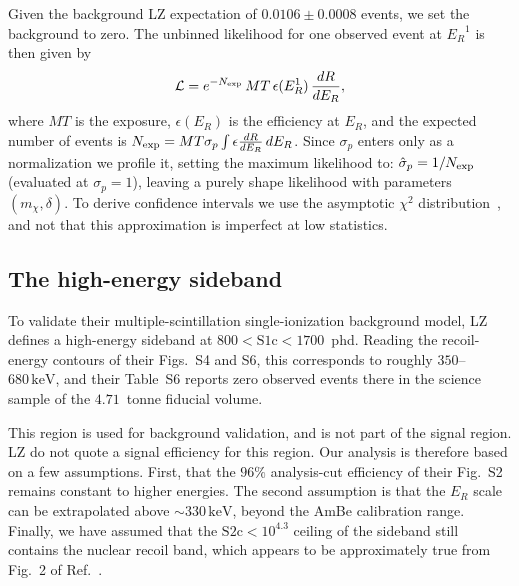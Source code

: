 \documentclass[aps,prl,twocolumn,superscriptaddress,nofootinbib,floatfix,longbibliography]{revtex4-2}
\newcommand{\keV}{\ensuremath{\,\mathrm{keV}}}
\newcommand{\ER}{\ensuremath{E_R}}
\newcommand{\mchi}{\ensuremath{m_\chi}}
\begin{document}
Given the background LZ expectation of $0.0106\pm0.0008$ events, we set the background to zero. The unbinned likelihood for one observed event at $\ER^{1}$ is then given by
%
\begin{equation}
  \mathcal{L} = e^{-N_{\rm exp}}\, MT\, \epsilon(\ER^{1})\,\frac{dR}{d\ER},
\end{equation}
%
where $MT$ is the exposure, $\epsilon(E_R)$ is the efficiency at $E_R$, and the expected number of events is $N_{\rm exp} = MT\sigma_p\int \epsilon \frac{dR}{d\ER}\, d\ER$. Since $\sigma_p$ enters only as a normalization we profile it, setting the maximum likelihood to: $\hat\sigma_p = 1/N_{\rm exp}$ (evaluated at $\sigma_p=1$), leaving a purely shape likelihood with parameters $(\mchi,\delta)$. To derive confidence intervals we use the asymptotic $\chi^2$ distribution~\cite{Cowan:2010js}, and not that this approximation is imperfect at low statistics.
 

\subsection{The high-energy sideband}
\label{sec:sideband}

To validate their multiple-scintillation single-ionization background model, LZ defines a high-energy sideband at $800 < \mathrm{S1c} < 1700$~phd. Reading the recoil-energy contours of their Figs.~S4 and S6, this corresponds to roughly $350$--$680\keV$, and their Table~S6 reports zero observed events there in the science sample of the $4.71$~tonne fiducial volume.

This region is used for background validation, and is not part of the signal region. LZ do not quote a signal efficiency for this region. Our analysis is therefore based on a few assumptions. First, that the $96\%$ analysis-cut efficiency of their Fig.~S2 remains constant to higher energies. The second assumption is that the $E_R$ scale can be extrapolated above $\sim330\keV$, beyond the AmBe calibration range. Finally, we have assumed that the $\mathrm{S2c} < 10^{4.3}$ ceiling of the sideband still contains the nuclear recoil band, which appears to be approximately true from Fig.~2 of Ref.~\cite{LZ:2026axp}.
\end{document}
